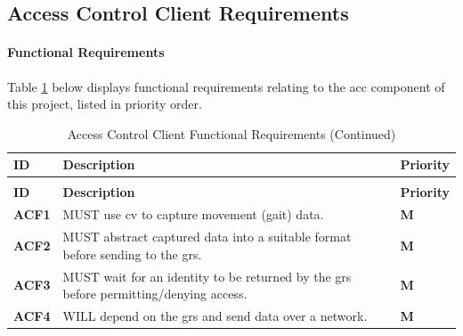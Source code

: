 \subsection{Access Control Client Requirements}
\label{subsec:acc-requirements}

\paragraph{Functional Requirements} Table \ref{tab:acc-functional-requirements} below displays functional requirements relating to the \ac{acc} component of this project, listed in priority order. \\

\begin{scriptsize}
    \begin{longtable}[H]{|p{}|p{}|p{}|}
        \caption{Access Control Client Functional Requirements}
        \label{tab:acc-functional-requirements}                                                                                                            \\
        \hline
        \textbf{ID}    & \textbf{Description}                                                                           & \textbf{Priority}                \\ \hline
        \endfirsthead
        \caption*{Access Control Client Functional Requirements (Continued)}                                                                               \\
        \hline
        \textbf{ID}    & \textbf{Description}                                                                           & \textbf{Priority}                \\ \hline
        \endhead
        \hline
        \endfoot
        \textbf{ACF1}  & MUST use \ac{cv} to capture movement (gait) data.                                              & \cellcolor{red!10} \textbf{M}    \\ \hline
        \textbf{ACF2}  & MUST abstract captured data into a suitable format before sending to the \ac{grs}.             & \cellcolor{red!10} \textbf{M}    \\ \hline
        \textbf{ACF3}  & MUST wait for an identity to be returned by the \ac{grs} before permitting/denying access.     & \cellcolor{red!10} \textbf{M}    \\ \hline
        \textbf{ACF4}  & WILL depend on the \ac{grs} and send data over a network.                                      & \cellcolor{red!10} \textbf{M}    \\ \hline

\end{longtable}
\end{scriptsize}

